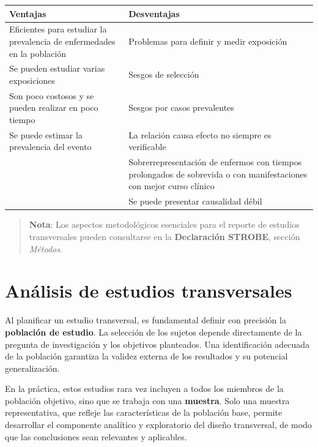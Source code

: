 \documentclass[
  spanish,
  a4paper,
]{scrbook}
\newcounter{none} %
\begin{document}
{\def\LTcaptype{none} %
\begin{longtable}[]{@{}
  >{\raggedright\arraybackslash}p{}
  >{\raggedright\arraybackslash}p{}@{}}
\toprule\noalign{}
\begin{minipage}[b]{\linewidth}\raggedright
Ventajas
\end{minipage} & \begin{minipage}[b]{\linewidth}\raggedright
Desventajas
\end{minipage} \\
\midrule\noalign{}
\endhead
\bottomrule\noalign{}
\endlastfoot
Eficientes para estudiar la prevalencia de enfermedades en la población
& Problemas para definir y medir exposición \\
Se pueden estudiar varias exposiciones & Sesgos de selección \\
Son poco costosos y se pueden realizar en poco tiempo & Sesgos por casos
prevalentes \\
Se puede estimar la prevalencia del evento & La relación causa efecto no
siempre es verificable \\
& Sobrerrepresentación de enfermos con tiempos prolongados de sobrevida
o con manifestaciones con mejor curso clínico \\
& Se puede presentar causalidad débil \\
\end{longtable}
}

\begin{quote}
\textbf{Nota}: Los aspectos metodológicos esenciales para el reporte de
estudios transversales pueden consultarse en la \textbf{Declaración
STROBE}, sección \emph{Métodos}.
\end{quote}

\section{Análisis de estudios
transversales}\label{anuxe1lisis-de-estudios-transversales}

Al planificar un estudio transversal, es fundamental definir con
precisión la \textbf{población de estudio}. La selección de los sujetos
depende directamente de la pregunta de investigación y los objetivos
planteados. Una identificación adecuada de la población garantiza la
validez externa de los resultados y su potencial generalización.

En la práctica, estos estudios rara vez incluyen a todos los miembros de
la población objetivo, sino que se trabaja con una \textbf{muestra}.
Solo una muestra representativa, que refleje las características de la
población base, permite desarrollar el componente analítico y
exploratorio del diseño transversal, de modo que las conclusiones sean
relevantes y aplicables.
\end{document}
